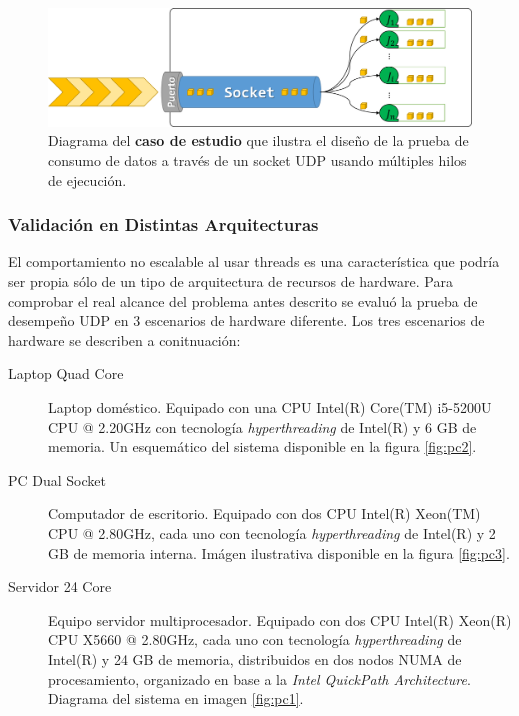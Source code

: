 \begin{figure}[!h]
	\centering
	\includegraphics[scale=0.5]{imagenes/casoDeEstudio.png}
	\caption{Diagrama del \textbf{caso de estudio} que ilustra el diseño de la prueba de consumo de datos a través de un socket UDP usando múltiples hilos de ejecución.}
	\label{fig:testUDP}
\end{figure}

\subsubsection{Validación en Distintas Arquitecturas}

El comportamiento no escalable al usar threads es una característica que podría ser propia sólo de un tipo de arquitectura de recursos de hardware. Para comprobar el real alcance del problema antes descrito se evaluó la prueba de desempeño UDP en 3 escenarios de hardware diferente. Los tres escenarios de hardware se describen a conitnuación:

\begin{description}
\item[Laptop Quad Core] Laptop doméstico. Equipado con una CPU Intel(R) Core(TM) i5-5200U CPU @ 2.20GHz con tecnología \emph{hyperthreading} de Intel(R) y 6 GB de memoria. Un esquemático del sistema disponible en la figura \ref{fig:pc2}.
\item[PC Dual Socket] Computador de escritorio. Equipado con dos CPU Intel(R) Xeon(TM) CPU @ 2.80GHz, cada uno con tecnología \emph{hyperthreading} de Intel(R) y 2 GB de memoria interna. Imágen ilustrativa disponible en la figura \ref{fig:pc3}.
\item[Servidor 24 Core] Equipo servidor multiprocesador. Equipado con dos CPU Intel(R) Xeon(R) CPU X5660 @ 2.80GHz, cada uno con tecnología \emph{hyperthreading} de Intel(R) y 24 GB de memoria, distribuidos en dos nodos NUMA de procesamiento, organizado en base a la \emph{Intel QuickPath Architecture}. Diagrama del sistema en imagen \ref{fig:pc1}.
\end{description}

